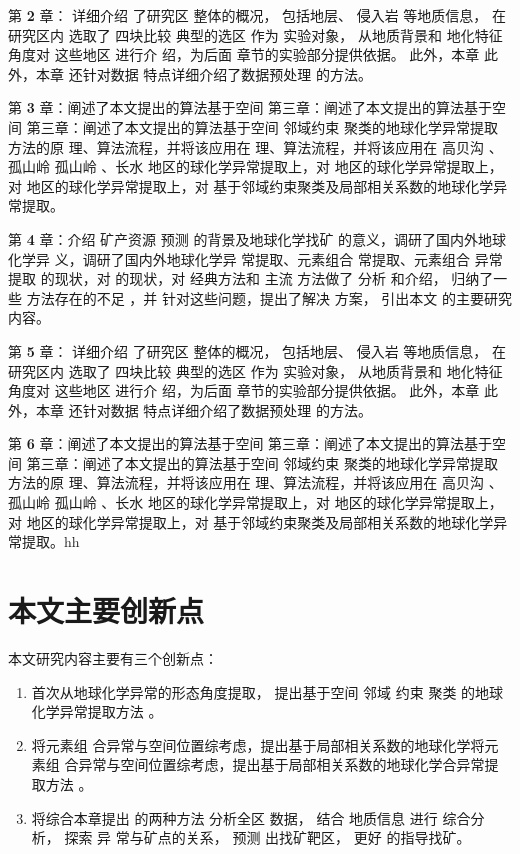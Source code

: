 第 \textbf{2} 章： 详细介绍 了研究区 整体的概况， 包括地层、 侵入岩 等地质信息， 在研究区内 选取了 四块比较 典型的选区 作为 实验对象， 从地质背景和 地化特征 角度对 这些地区 进行介 绍，为后面 章节的实验部分提供依据。 此外，本章 此外，本章 还针对数据 特点详细介绍了数据预处理 的方法。

第 \textbf{3} 章：阐述了本文提出的算法基于空间 第三章：阐述了本文提出的算法基于空间 第三章：阐述了本文提出的算法基于空间 邻域约束 聚类的地球化学异常提取 方法的原 理、算法流程，并将该应用在 理、算法流程，并将该应用在 高贝沟 、孤山岭 孤山岭 、长水 地区的球化学异常提取上，对 地区的球化学异常提取上，对 地区的球化学异常提取上，对
基于邻域约束聚类及局部相关系数的地球化学异常提取。

第 \textbf{4} 章：介绍 矿产资源 预测 的背景及地球化学找矿 的意义，调研了国内外地球化学异 义，调研了国内外地球化学异 常提取、元素组合 常提取、元素组合 异常提取 的现状，对 的现状，对 经典方法和 主流 方法做了 分析 和介绍， 归纳了一些 方法存在的不足 ，并 针对这些问题，提出了解决 方案， 引出本文 的主要研究内容。

第 \textbf{5} 章： 详细介绍 了研究区 整体的概况， 包括地层、 侵入岩 等地质信息， 在研究区内 选取了 四块比较 典型的选区 作为 实验对象， 从地质背景和 地化特征 角度对 这些地区 进行介 绍，为后面 章节的实验部分提供依据。 此外，本章 此外，本章 还针对数据 特点详细介绍了数据预处理 的方法。

第 \textbf{6} 章：阐述了本文提出的算法基于空间 第三章：阐述了本文提出的算法基于空间 第三章：阐述了本文提出的算法基于空间 邻域约束 聚类的地球化学异常提取 方法的原 理、算法流程，并将该应用在 理、算法流程，并将该应用在 高贝沟 、孤山岭 孤山岭 、长水 地区的球化学异常提取上，对 地区的球化学异常提取上，对 地区的球化学异常提取上，对
基于邻域约束聚类及局部相关系数的地球化学异常提取。hh


\section{本文主要创新点}
\label{sec:forth}
本文研究内容主要有三个创新点：
\begin{enumerate}[(1)]
    \item 首次从地球化学异常的形态角度提取， 提出基于空间 邻域 约束 聚类 的地球化学异常提取方法 。
    \item 将元素组 合异常与空间位置综考虑，提出基于局部相关系数的地球化学将元素组 合异常与空间位置综考虑，提出基于局部相关系数的地球化学合异常提取方法 。
    \item 将综合本章提出 的两种方法 分析全区 数据， 结合 地质信息 进行 综合分析， 探索 异 常与矿点的关系， 预测 出找矿靶区， 更好 的指导找矿。

\end{enumerate}

